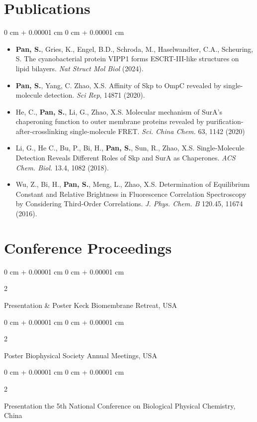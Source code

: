 \documentclass[10pt, letterpaper]{article}
\newenvironment{highlightsforbulletentries}{
        \begin{itemize}[
                topsep=0.10 cm,
                parsep=0.10 cm,
                partopsep=0pt,
                itemsep=0pt,
                leftmargin=10pt
                ]
        }{
\end{itemize}
} %
\newenvironment{onecolentry}{
        \begin{adjustwidth}{
                        0 cm + 0.00001 cm
                }{
                        0 cm + 0.00001 cm
                }
        }{
        \end{adjustwidth}
} %
\newenvironment{twocolentry}[2][]{
        \onecolentry
        \def\secondColumn{#2}
        \setcolumnwidth{\fill, 4.5 cm}
        \begin{paracol}{2}
        }{
                \switchcolumn \raggedleft \secondColumn
        \end{paracol}
        \endonecolentry
} %
\begin{document}
\section{Publications}
\begin{samepage}
        \begin{onecolentry}
                \begin{highlightsforbulletentries}
                \item \textbf{Pan, S.}, Gries, K., Engel, B.D., Schroda, M., Haselwandter, C.A., Scheuring, S. The cyanobacterial protein VIPP1 forms ESCRT-III-like structures on lipid bilayers. \textit{Nat Struct Mol Biol} (2024).
                \item \textbf{Pan, S.}, Yang, C. Zhao, X.S. Affinity of Skp to OmpC revealed by single-molecule detection. \textit{Sci Rep}, 14871 (2020).
                \item He, C., \textbf{Pan, S.}, Li, G., Zhao, X.S. Molecular mechanism of SurA’s chaperoning function to outer membrane proteins revealed by purification-after-crosslinking single-molecule FRET. \textit{Sci. China Chem.} 63, 1142 (2020)
                \item Li, G., He C., Bu, P., Bi, H., \textbf{Pan, S.}, Sun, R., Zhao, X.S. Single-Molecule Detection Reveals Different Roles of Skp and SurA as Chaperones. \textit{ACS Chem. Biol.} 13.4, 1082 (2018).
                \item Wu, Z., Bi, H., \textbf{Pan, S.}, Meng, L., Zhao, X.S. Determination of Equilibrium Constant and Relative Brightness in Fluorescence Correlation Spectroscopy by Considering Third-Order Correlations. \textit{J. Phys. Chem. B} 120.45, 11674 (2016).
                \end{highlightsforbulletentries}
        \end{onecolentry}
\end{samepage}

\section{Conference Proceedings}
\begin{twocolentry}{2024}
        Presentation \& Poster \hfill Keck Biomembrane Retreat, USA\end{twocolentry}
\begin{twocolentry}{2024}
        Poster \hfill Biophysical Society Annual Meetings, USA\end{twocolentry}
\begin{twocolentry}{2018}
        Presentation \hfill the 5th National Conference on Biological Physical Chemistry, China\end{twocolentry}
\end{document}
